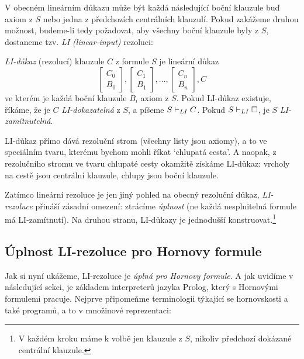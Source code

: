 V obecném lineárním důkazu může být každá následující boční klauzule buď axiom z $S$ nebo jedna z předchozích centrálních klauzulí. Pokud zakážeme druhou možnost, budeme-li tedy požadovat, aby všechny boční klauzule byly z $S$, dostaneme tzv. \emph{LI (linear-input)} rezoluci:
    
\begin{definition}[LI-důkaz]
    \emph{LI-důkaz} (rezolucí) klauzule $C$ z formule $S$ je lineární důkaz 
    $$
    \begin{bmatrix}
        C_0 \\
        B_0
    \end{bmatrix},
    \begin{bmatrix}
        C_1 \\
        B_1
    \end{bmatrix},\dots,
    \begin{bmatrix}
        C_n \\
        B_n
    \end{bmatrix},
    C
    $$
    ve kterém je každá boční klauzule $B_i$ axiom z $S$. Pokud LI-důkaz existuje, říkáme, že je $C$ \emph{LI-dokazatelná} z $S$, a píšeme $S\vdash_{LI}C$. Pokud $S\vdash_{LI}\square$, je $S$ \emph{LI-zamítnutelná}.
\end{definition}

\begin{remark}
    LI-důkaz přímo dává rezoluční strom (všechny listy jsou axiomy), a to ve speciálním tvaru, kterému bychom mohli říkat `chlupatá cesta'. A naopak, z rezolučního stromu ve tvaru chlupaté cesty okamžitě získáme LI-důkaz: vrcholy na cestě jsou centrální klauzule, chlupy jsou boční klauzule.
\end{remark}

Zatímco lineární rezoluce je jen jiný pohled na obecný rezoluční důkaz, \emph{LI-rezoluce} přináší zásadní omezení: ztrácíme \emph{úplnost} (ne každá nesplnitelná formule má LI-zamítnutí). Na druhou stranu, LI-důkazy je jednodušší konstruovat.\footnote{V každém kroku máme k volbě jen klauzule z $S$, nikoliv předchozí dokázané centrální klauzule.} 

\subsection{Úplnost LI-rezoluce pro Hornovy formule}

Jak si nyní ukážeme, LI-rezoluce je \emph{úplná pro Hornovy formule}. A jak uvidíme v následující sekci, je základem interpreterů jazyka Prolog, který s Hornovými formulemi pracuje. Nejprve připomeňme terminologii týkající se hornovskosti a také programů, a to v množinové reprezentaci:


